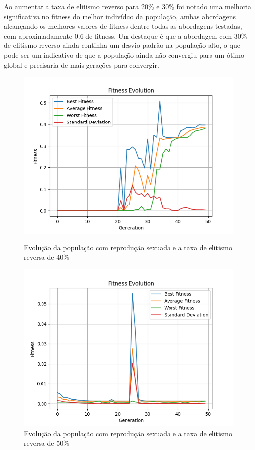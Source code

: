 \documentclass[12pt]{article}
\begin{document}
Ao aumentar a taxa de elitismo reverso para 20\% e 30\% foi notado uma melhoria significativa no fitness do melhor indivíduo da população, ambas abordagens alcançando os melhores valores de fitness dentre todas as abordagens testadas, com aproximadamente 0.6 de fitness. Um destaque é que a abordagem com 30\% de elitismo reverso ainda continha um desvio padrão na população alto, o que pode ser um indicativo de que a população ainda não convergiu para um ótimo global e precisaria de mais gerações para convergir.

\begin{figure}[h]
    \centering
    \begin{minipage}{0.5\textwidth}
        \centering
        \includegraphics[width=\linewidth]{figures/sexuado/rev_el_40.png}
        \caption{Evolução da população com reprodução sexuada e a taxa de elitismo reversa de 40\%}
        \label{fig:reverse_elitism_sex_40}
    \end{minipage}\hfill
    \begin{minipage}{0.5\textwidth}
        \centering
        \includegraphics[width=\linewidth]{figures/sexuado/rev_el_50.png}
        \caption{Evolução da população com reprodução sexuada e a taxa de elitismo reversa de 50\%}
        \label{fig:reverse_elitism_sex_50}
    \end{minipage}
\end{figure}
\end{document}
